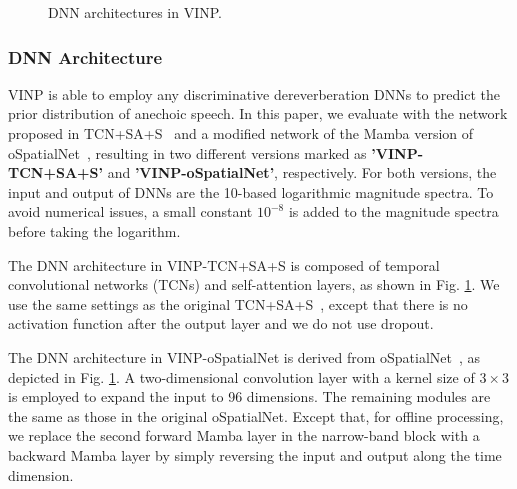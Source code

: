 \begin{figure}[H]
    \centering
    \hfill
    \caption{DNN architectures in VINP.}
    \label{fig:DNNarch}
\end{figure}

\subsubsection{DNN Architecture}
VINP is able to employ any discriminative dereverberation DNNs to predict the prior distribution of anechoic speech.
In this paper, we evaluate with the network proposed in TCN+SA+S~\cite{zhao2020monaural} and a modified network of the Mamba version of oSpatialNet~\cite{10570301}, resulting in two different versions marked as \textbf{'VINP-TCN+SA+S'} and \textbf{'VINP-oSpatialNet'}, respectively.
For both versions, the input and output of DNNs are the 10-based logarithmic magnitude spectra.
To avoid numerical issues, a small constant $10^{-8}$ is added to the magnitude spectra before taking the logarithm.

The DNN architecture in VINP-TCN+SA+S is composed of temporal convolutional networks (TCNs) and self-attention layers, as shown in Fig. \ref{fig:DNNarch}.
We use the same settings as the original TCN+SA+S~\cite {zhao2020monaural}, except that there is no activation function after the output layer and we do not use dropout.

The DNN architecture in VINP-oSpatialNet is derived from oSpatialNet~\cite{10570301}, as depicted in Fig. \ref{fig:DNNarch}.
A two-dimensional convolution layer with a kernel size of $3 \times 3$  is employed to expand the input to 96 dimensions.
The remaining modules are the same as those in the original oSpatialNet. 
Except that, for offline processing, we replace the second forward Mamba layer in the narrow-band block with a backward Mamba layer by simply reversing the input and output along the time dimension.



